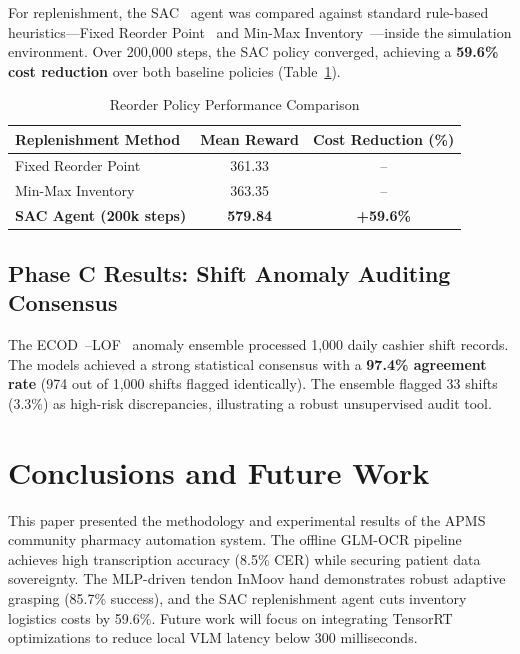 \documentclass[conference]{IEEEtran}
\begin{document}
For replenishment, the SAC~\cite{sac} agent was compared against standard rule-based heuristics---Fixed Reorder Point~\cite{reorder_policies} and Min-Max Inventory~\cite{reorder_policies}---inside the simulation environment. Over 200,000 steps, the SAC policy converged, achieving a \textbf{59.6\% cost reduction} over both baseline policies (Table~\ref{tab:reorder_results}).

\begin{table}[htbp]
\caption{Reorder Policy Performance Comparison}
\label{tab:reorder_results}
\centering
\begin{tabular}{lcc}
\toprule
\textbf{Replenishment Method} & \textbf{Mean Reward} & \textbf{Cost Reduction (\%)} \\
\midrule
Fixed Reorder Point~\cite{reorder_policies} & 361.33 & -- \\
Min-Max Inventory~\cite{reorder_policies} & 363.35 & -- \\
\textbf{SAC Agent (200k steps)} & \textbf{579.84} & \textbf{+59.6\%} \\
\bottomrule
\end{tabular}
\end{table}

\subsection{Phase C Results: Shift Anomaly Auditing Consensus}
The ECOD~\cite{ecod}--LOF~\cite{lof} anomaly ensemble processed 1,000 daily cashier shift records. The models achieved a strong statistical consensus with a \textbf{97.4\% agreement rate} (974 out of 1,000 shifts flagged identically). The ensemble flagged 33 shifts (3.3\%) as high-risk discrepancies, illustrating a robust unsupervised audit tool.

\section{Conclusions and Future Work}
This paper presented the methodology and experimental results of the APMS community pharmacy automation system. The offline GLM-OCR pipeline achieves high transcription accuracy (8.5\% CER) while securing patient data sovereignty. The MLP-driven tendon InMoov hand demonstrates robust adaptive grasping (85.7\% success), and the SAC replenishment agent cuts inventory logistics costs by 59.6\%. Future work will focus on integrating TensorRT optimizations to reduce local VLM latency below 300 milliseconds.
\end{document}
